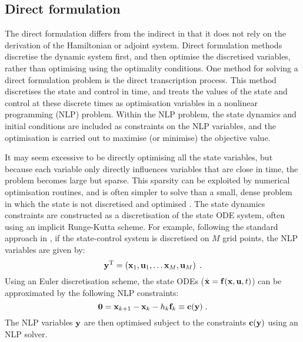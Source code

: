 \subsection{Direct formulation}

The direct formulation differs from the indirect in that it does not rely on the derivation of the Hamiltonian or adjoint system. Direct formulation methods discretise the dynamic system first, and then optimise the discretised variables, rather than optimising using the optimality conditions. One method for solving a direct formulation problem is the direct transcription process. This method discretises the state and control in time, and treats the values of the state and control at these discrete times as optimisation variables in a nonlinear programming (NLP) problem. Within the NLP problem, the state dynamics and initial conditions are included as constraints on the NLP variables, and the optimisation is carried out to maximise (or minimise) the objective value.

It may seem excessive to be directly optimising all the state variables, but because each variable only directly influences variables that are close in time, the problem becomes large but sparse. This sparsity can be exploited by numerical optimisation routines, and is often simpler to solve than a small, dense problem in which the state is not discretised and optimised \citep{betts_practical_2010}. The state dynamics constraints are constructed as a discretisation of the state ODE system, often using an implicit Runge-Kutta scheme. For example, following the standard approach in \citet{betts_practical_2010}, if the state-control system is discretised on $M$ grid points, the NLP variables are given by:
\begin{equation}
    \mathbf{\bm{y}}^\mathrm{T} = \left(\mathbf{\bm{x}}_1, \mathbf{\bm{u}}_1, \ldots \mathbf{\bm{x}}_M, \mathbf{\bm{u}}_M\right)\;.
\end{equation}
Using an Euler discretisation scheme, the state ODEs ($\dot{\mathbf{\bm{x}}} = \mathbf{\bm{f}}(\mathbf{\bm{x}}, \mathbf{\bm{u}}, t)$) can be approximated by the following NLP constraints:
\begin{equation}
    \mathbf{\bm{0}} = \mathbf{\bm{x}}_{k+1} - \mathbf{\bm{x}}_k -h_k\mathbf{\bm{f}}_k \equiv \mathbf{\bm{c}}(\mathbf{\bm{y}})\;.
\end{equation}
The NLP variables $\mathbf{\bm{y}}$ are then optimised subject to the constraints $\mathbf{\bm{c}}(\mathbf{\bm{y}})$ using an NLP solver.

